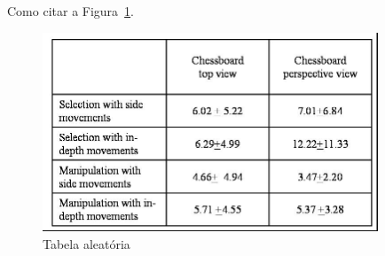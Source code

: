 Como citar a Figura~\ref{fig:uc}.
\begin{figure}[!h]
\centering
    \includegraphics[width=10cm]{img/table.jpg}
    \caption{Tabela aleatória}
    \label{fig:uc} %
\end{figure}